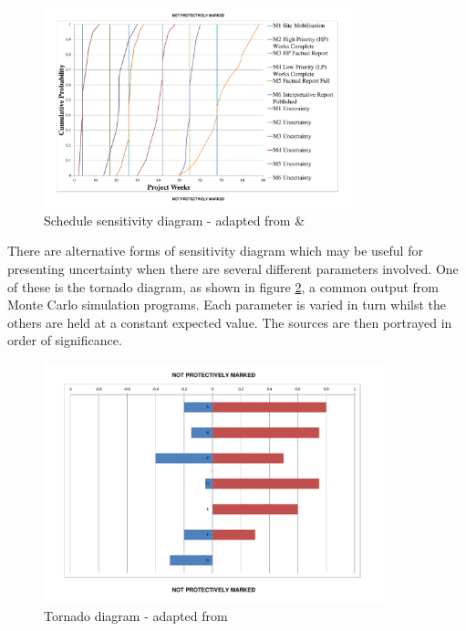 \begin{figure}[!h]
  \centering
    \includegraphics[width = 0.8\textwidth]{./Figures/ScheduleSensitivity.pdf} 
\caption{Schedule sensitivity diagram - adapted from \cite{hopkinson2008} \& \cite{chapman} }
\label{Figure:SensDiagGantt}
\end{figure}

There are alternative forms of sensitivity diagram which may be useful for presenting uncertainty when there are several different parameters involved. 
One of these is the tornado diagram, as shown in figure \ref{Figure:Tornado}, a common output from Monte Carlo simulation programs.
Each parameter is varied in turn whilst the others are held at a constant expected value.
The sources are then portrayed in order of significance.

\begin{figure}[!h]
  \centering
    \includegraphics[width = 0.88\textwidth]{./Figures/TornadoFig.pdf} 
\caption{Tornado diagram - adapted from \cite{hopkinson2008}}
\label{Figure:Tornado}
\end{figure}

